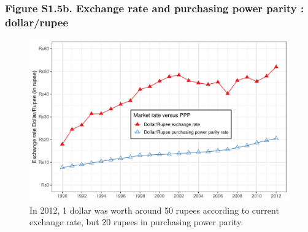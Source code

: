 \documentclass[t]{beamer}\usepackage[]{graphicx}\usepackage[]{color}
\newenvironment{knitrout}{}{} %
\begin{document}
\begin{frame}[label=Figure_S1_5b,fragile]
\frametitle{Figure S1.5b. Exchange rate and purchasing power parity : dollar/rupee}
\begin{figure}[t]
\begin{minipage}[b]{\textwidth}
\centering
\begin{knitrout}\footnotesize
{}\color{fgcolor}

{\centering \includegraphics[width=1\linewidth]{figures/color/Figure_S1_5b} 

}



\end{knitrout}
\caption{In 2012, 1 dollar was worth around 50 rupees according to current exchange rate, but 20 rupees in purchasing power parity.}
\end{minipage}
\end{figure}
\end{frame}
\end{document}
